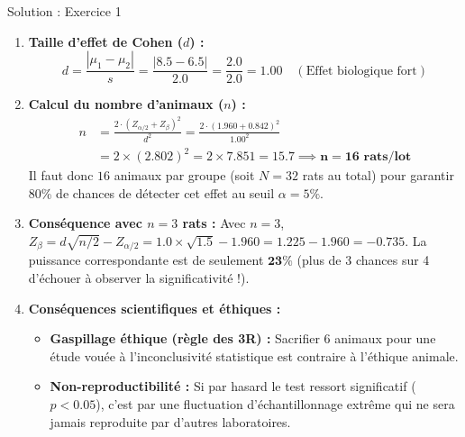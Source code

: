\documentclass[11pt,a4paper]{article}
\begin{document}
\begin{solutionbox}{Solution : Exercice 1}
\begin{enumerate}[label=\textbf{\alph*.}]
  \item \textbf{Taille d'effet de Cohen ($d$) :}
  \begin{equation*}
    d = \frac{|\mu_1 - \mu_2|}{s} = \frac{|8.5 - 6.5|}{2.0} = \frac{2.0}{2.0} = \mathbf{1.00} \quad (\text{Effet biologique fort})
  \end{equation*}
  \item \textbf{Calcul du nombre d'animaux ($n$) :}
  \begin{align*}
    n &= \frac{2 \cdot (Z_{\alpha/2} + Z_\beta)^2}{d^2} = \frac{2 \cdot (1.960 + 0.842)^2}{1.00^2} \\
    &= 2 \times (2.802)^2 = 2 \times 7.851 = \mathbf{15.7} \implies \mathbf{n = 16 \text{ rats/lot}}
  \end{align*}
  Il faut donc $16$ animaux par groupe (soit $N = 32$ rats au total) pour garantir 80\% de chances de détecter cet effet au seuil $\alpha = 5\%$.
  \item \textbf{Conséquence avec $n = 3$ rats :}
  Avec $n = 3$, $Z_\beta = d \sqrt{n/2} - Z_{\alpha/2} = 1.0 \times \sqrt{1.5} - 1.960 = 1.225 - 1.960 = -0.735$.
  La puissance correspondante est de seulement $\mathbf{23\%}$ (plus de 3 chances sur 4 d'échouer à observer la significativité !).
  \item \textbf{Conséquences scientifiques et éthiques :}
  \begin{itemize}
    \item \textbf{Gaspillage éthique (règle des 3R) :} Sacrifier 6 animaux pour une étude vouée à l'inconclusivité statistique est contraire à l'éthique animale.
    \item \textbf{Non-reproductibilité :} Si par hasard le test ressort significatif ($p < 0.05$), c'est par une fluctuation d'échantillonnage extrême qui ne sera jamais reproduite par d'autres laboratoires.
  \end{itemize}
\end{enumerate}
\end{solutionbox}
\end{document}
